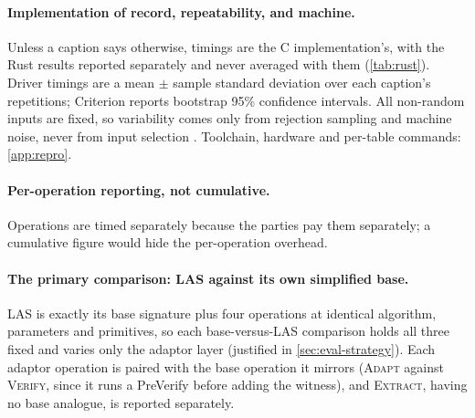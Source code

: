 \paragraph{Implementation of record, repeatability, and machine.}
Unless a caption says otherwise, timings are the C implementation's, with the Rust results
reported separately and never averaged with them (\cref{tab:rust}).
Driver timings are a mean
$\pm$ sample standard deviation over each caption's repetitions; Criterion reports
bootstrap 95\% confidence intervals. All
non-random inputs are fixed, so variability comes only from rejection sampling and machine
noise, never from input selection \cite{riou2026apples}. Toolchain, hardware and per-table
commands: \cref{app:repro}.

\paragraph{Per-operation reporting, not cumulative.}
Operations are timed separately because the parties pay them separately; a cumulative
figure would hide the per-operation overhead.

\paragraph{The primary comparison: LAS against its own simplified base.}
LAS is exactly its base signature plus four operations at identical algorithm, parameters
and primitives, so each base-versus-LAS comparison holds all three fixed and varies only
the adaptor layer (justified in \cref{sec:eval-strategy}). Each adaptor operation is paired with the base
operation it mirrors (\textsc{Adapt} against \textsc{Verify}, since it runs a
PreVerify before adding the witness), and \textsc{Extract}, having no base analogue, is
reported separately.

